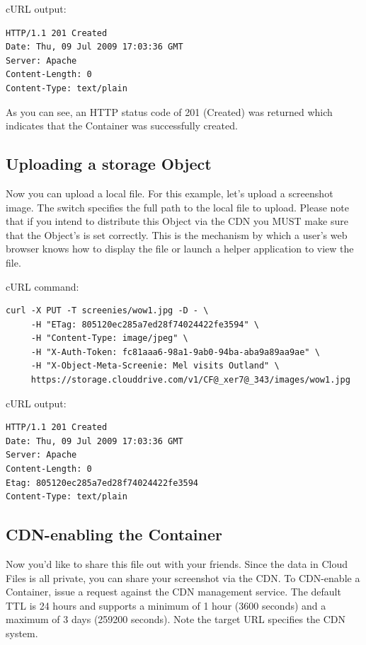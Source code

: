 \documentclass[letterpaper,10pt,english]{manual}
\begin{document}
cURL output:

\begin{Verbatim}[commandchars=@\[\]]
HTTP/1.1 201 Created
Date: Thu, 09 Jul 2009 17:03:36 GMT
Server: Apache
Content-Length: 0
Content-Type: text/plain
\end{Verbatim}

As you can see, an HTTP status code of 201 (Created) was returned which
indicates that the Container was successfully created.


\subsection{Uploading a storage Object}

Now you can upload a local file.  For this example, let's upload a
screenshot image.  The  switch specifies the full path to the
local file to upload.  Please note that if you intend to distribute
this Object via the CDN you MUST make sure that the Object's
 is set correctly.  This is the mechanism by which
a user's web browser knows how to display the file or launch a
helper application to view the file.

cURL command:

\begin{Verbatim}[commandchars=@\[\]]
curl -X PUT -T screenies/wow1.jpg -D - \
     -H "ETag: 805120ec285a7ed28f74024422fe3594" \
     -H "Content-Type: image/jpeg" \
     -H "X-Auth-Token: fc81aaa6-98a1-9ab0-94ba-aba9a89aa9ae" \
     -H "X-Object-Meta-Screenie: Mel visits Outland" \
     https://storage.clouddrive.com/v1/CF@_xer7@_343/images/wow1.jpg
\end{Verbatim}

cURL output:

\begin{Verbatim}[commandchars=@\[\]]
HTTP/1.1 201 Created
Date: Thu, 09 Jul 2009 17:03:36 GMT
Server: Apache
Content-Length: 0
Etag: 805120ec285a7ed28f74024422fe3594
Content-Type: text/plain
\end{Verbatim}


\subsection{CDN-enabling the Container}

Now you'd like to share this file out with your friends.  Since the data
in Cloud Files is all private, you can share your screenshot via the CDN.
To CDN-enable a Container, issue a  request against the CDN
management service.  The default TTL is 24 hours and supports a minimum
of 1 hour (3600 seconds) and a maximum of 3 days (259200 seconds).  Note
the target URL specifies the CDN system.
\end{document}
